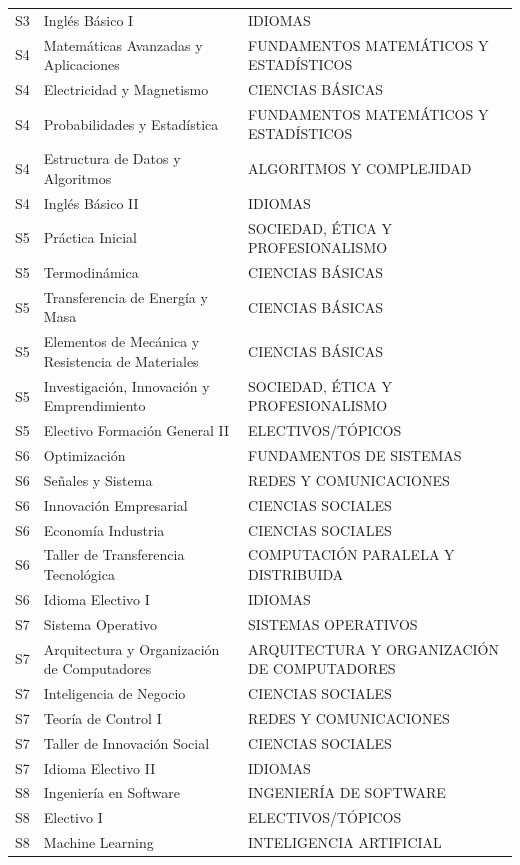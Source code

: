 \documentclass[11pt,a4paper]{article}
\begin{document}
\begin{small}
\begin{longtable}{c >{\raggedright\arraybackslash}p{8.5cm} >{\raggedright\arraybackslash}p{5.5cm}}
S3 & Inglés Básico I & IDIOMAS \\
S4 & Matemáticas Avanzadas y Aplicaciones & FUNDAMENTOS MATEMÁTICOS Y ESTADÍSTICOS \\
S4 & Electricidad y Magnetismo & CIENCIAS BÁSICAS \\
S4 & Probabilidades y Estadística & FUNDAMENTOS MATEMÁTICOS Y ESTADÍSTICOS \\
S4 & Estructura de Datos y Algoritmos & ALGORITMOS Y COMPLEJIDAD \\
S4 & Inglés Básico II & IDIOMAS \\
S5 & Práctica Inicial & SOCIEDAD, ÉTICA Y PROFESIONALISMO \\
S5 & Termodinámica & CIENCIAS BÁSICAS \\
S5 & Transferencia de Energía y Masa & CIENCIAS BÁSICAS \\
S5 & Elementos de Mecánica y Resistencia de Materiales & CIENCIAS BÁSICAS \\
S5 & Investigación, Innovación y Emprendimiento & SOCIEDAD, ÉTICA Y PROFESIONALISMO \\
S5 & Electivo Formación General II & ELECTIVOS/TÓPICOS \\
S6 & Optimización & FUNDAMENTOS DE SISTEMAS \\
S6 & Señales y Sistema & REDES Y COMUNICACIONES \\
S6 & Innovación Empresarial & CIENCIAS SOCIALES \\
S6 & Economía Industria & CIENCIAS SOCIALES \\
S6 & Taller de Transferencia Tecnológica & COMPUTACIÓN PARALELA Y DISTRIBUIDA \\
S6 & Idioma Electivo I & IDIOMAS \\
S7 & Sistema Operativo & SISTEMAS OPERATIVOS \\
S7 & Arquitectura y Organización de Computadores & ARQUITECTURA Y ORGANIZACIÓN DE COMPUTADORES \\
S7 & Inteligencia de Negocio & CIENCIAS SOCIALES \\
S7 & Teoría de Control I & REDES Y COMUNICACIONES \\
S7 & Taller de Innovación Social & CIENCIAS SOCIALES \\
S7 & Idioma Electivo II & IDIOMAS \\
S8 & Ingeniería en Software & INGENIERÍA DE SOFTWARE \\
S8 & Electivo I & ELECTIVOS/TÓPICOS \\
S8 & Machine Learning & INTELIGENCIA ARTIFICIAL \\

\end{longtable}
\end{small}
\end{document}
